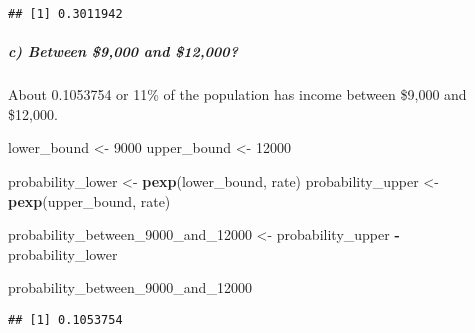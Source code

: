\documentclass[
]{article}
\newenvironment{Shaded}{\begin{snugshade}}{\end{snugshade}}
\newcommand{\DecValTok}[1]{\textcolor[rgb]{0.00,0.00,0.81}{#1}}
\newcommand{\FunctionTok}[1]{\textcolor[rgb]{0.13,0.29,0.53}{\textbf{#1}}}
\newcommand{\NormalTok}[1]{#1}
\newcommand{\OtherTok}[1]{\textcolor[rgb]{0.56,0.35,0.01}{#1}}
\newcommand{\SpecialCharTok}[1]{\textcolor[rgb]{0.81,0.36,0.00}{\textbf{#1}}}
\begin{document}
\begin{verbatim}
## [1] 0.3011942
\end{verbatim}

\hypertarget{c-between-9000-and-12000}{%
\subparagraph{c) Between \$9,000 and
\$12,000?}\label{c-between-9000-and-12000}}

About 0.1053754 or 11\% of the population has income between \$9,000 and
\$12,000.

\begin{Shaded}
\begin{Highlighting}[]
\NormalTok{lower\_bound }\OtherTok{\textless{}{-}} \DecValTok{9000}
\NormalTok{upper\_bound }\OtherTok{\textless{}{-}} \DecValTok{12000}

\NormalTok{probability\_lower }\OtherTok{\textless{}{-}} \FunctionTok{pexp}\NormalTok{(lower\_bound, rate)}
\NormalTok{probability\_upper }\OtherTok{\textless{}{-}} \FunctionTok{pexp}\NormalTok{(upper\_bound, rate)}


\NormalTok{probability\_between\_9000\_and\_12000 }\OtherTok{\textless{}{-}}\NormalTok{ probability\_upper }\SpecialCharTok{{-}}\NormalTok{ probability\_lower}

\NormalTok{probability\_between\_9000\_and\_12000}
\end{Highlighting}
\end{Shaded}

\begin{verbatim}
## [1] 0.1053754
\end{verbatim}
\end{document}
